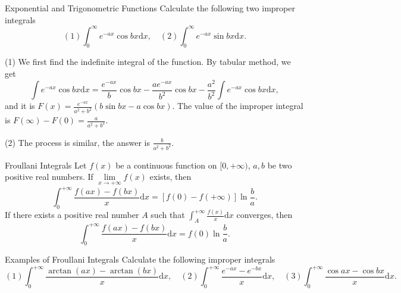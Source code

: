 \begin{example}{Exponential and Trigonometric Functions}{}
  Calculate the following two improper integrals
  \begin{equation}
    (1) \int_0^{\infty} e^{-ax} \cos bx \mathrm{d} x, \quad
    (2) \int_0^{\infty} e^{-ax} \sin bx\mathrm{d} x.
  \end{equation}
\end{example}

\begin{solution}
  (1) We first find the indefinite integral of the function. By tabular method,
  we get
  \begin{equation}
    \int e^{-ax} \cos bx \mathrm{d} x
    = \frac{e^{-ax}}{b} \cos bx - \frac{a e^{-ax}}{b^2}\cos bx - \frac{a^2}{b^2}\int e^{-ax}\cos bx\mathrm{d}x,
  \end{equation}
  and it is $F(x) = \frac{e^{-ax}}{a^2 + b^2}(b \sin bx - a \cos bx)$.
  The value of the improper integral is $F(\infty) - F(0) = \frac{a}{a^2 + b^2}$.

  (2) The process is similar, the answer is $\frac{b}{a^2 + b^2}$.
\end{solution}

\begin{theorem}{Froullani Integrals}{}
  Let $f(x)$ be a continuous function on $[0, +\infty)$,
  $a, b$ be two positive real numbers.
  If $\lim \limits _{x \rightarrow +\infty}f(x)$ exists, then
  \begin{equation}
    \int_0^{+\infty} \frac{f(ax) - f(bx)}{x}\mathrm{d} x
    = [f(0) - f(+\infty)] \ln \frac{b}{a}.
  \end{equation}
  If there exists a positive real number $A$ such that
  $\int_A^{+\infty} \frac{f(x)}{x}\mathrm{d} x$ converges, then
  \begin{equation}
    \int_0^{+\infty} \frac{f(ax) - f(bx)}{x}\mathrm{d} x
    = f(0) \ln \frac{b}{a}.
  \end{equation}
\end{theorem}

\begin{example}{Examples of Froullani Integrals}{}
  Calculate the following improper integrals
  \begin{equation}
    (1) \int_0^{+\infty} \frac{\arctan(ax) - \arctan(bx)}{x}\mathrm{d} x, \quad
    (2) \int_0^{+\infty} \frac{e^{-ax} - e^{-bx}}{x}\mathrm{d} x, \quad
    (3) \int_0^{+\infty} \frac{\cos ax - \cos bx}{x} \mathrm{d} x.
  \end{equation}
\end{example}


